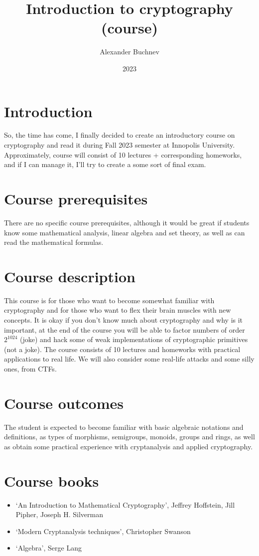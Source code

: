 \documentclass{article}
\title{Introduction to cryptography (course)}
\author{Alexander Buchnev}
\date{2023}
\begin{document}
\maketitle

\section*{Introduction}
So, the time has come, I finally decided to create an introductory course on cryptography and read it during Fall 2023 
semester at Innopolis University. Approximately, course will consist of 10 lectures + corresponding homeworks, and if I 
can manage it, I'll try to create a some sort of final exam. 

\section*{Course prerequisites}
There are no specific course prerequisites, although it would be great if students know some mathematical analysis, 
linear algebra and set theory, as well as can read the mathematical formulas.

\section*{Course description}
This course is for those who want to become somewhat familiar with cryptography and for those who want to flex their 
brain muscles with new concepts. It is okay if you don't know much about cryptography and why is it important, at the 
end of the course you will be able to factor numbers of order $2^{1024}$ (joke) and hack some of weak implementations of
cryptographic primitives (not a joke). The course consists of 10 lectures and homeworks with practical applications to 
real life. We will also consider some real-life attacks and some silly ones, from CTFs. 

\section*{Course outcomes}
The student is expected to become familiar with basic algebraic notations and definitions, as types of morphisms, 
semigroups, monoids, groups and rings, as well as obtain some practical experience with cryptanalysis and applied 
cryptography. 

\section*{Course books}
\begin{itemize}
    \item `An Introduction to Mathematical Cryptography', Jeffrey Hoffstein, Jill Pipher, Joseph H. Silverman
    \item `Modern Cryptanalysis techniques', Christopher Swanson
    \item `Algebra', Serge Lang
\end{itemize}
\end{document}

